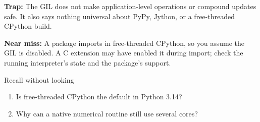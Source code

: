 \documentclass[11pt]{article}
\begin{document}
\begin{keepsection}
\begin{notebox}\textbf{Trap:} The GIL does not make application-level operations or compound updates safe. It also says nothing universal about PyPy, Jython, or a free-threaded CPython build.\end{notebox}

\begin{notebox}\textbf{Near miss:} A package imports in free-threaded CPython, so you assume the GIL is disabled. A C extension may have enabled it during import; check the running interpreter’s state and the package’s support.\end{notebox}

\begin{recallbox}{Recall without looking}
\begin{enumerate}
\item Is free-threaded CPython the default in Python 3.14?
\item Why can a native numerical routine still use several cores?
\end{enumerate}

\end{recallbox}
\end{keepsection}
\end{document}
